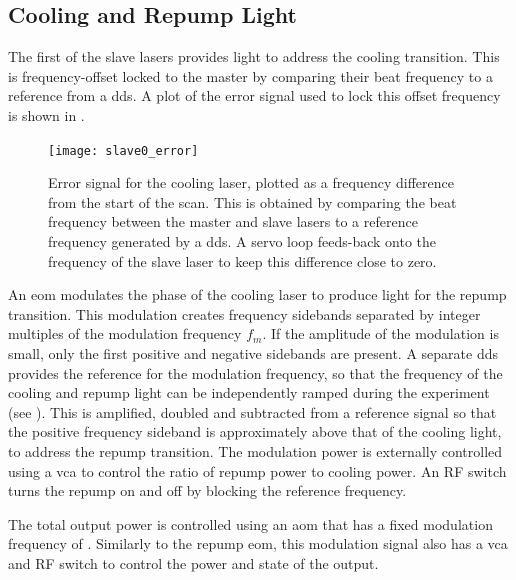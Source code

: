 \subsection{Cooling and Repump Light}
The first of the slave lasers provides light to address the cooling transition. This is
frequency-offset locked to the master by comparing their beat frequency to a
reference from a \ac{dds}. A plot of the error signal used to lock this offset
frequency is shown in .
\begin{figure}[!htbp]
	\centering
	\texttt{[image: slave0\_error]}
	\caption[Error Signal for the \Muquans\ Cooling laser.]{Error signal for the \Muquans cooling laser, plotted as a frequency difference from the start of the scan. This is obtained by comparing the beat frequency between the master and slave lasers to a reference frequency generated by a \ac{dds}. A servo loop feeds-back onto the frequency of the slave laser to keep this difference close to zero.}\label{fig:slave_offset}
\end{figure}
\par\noindent An \ac{eom} modulates the phase of the cooling laser to produce light for the  repump transition. This modulation creates frequency sidebands separated by integer multiples of the modulation frequency
\(f_m\). If the amplitude of the modulation is small, only the first
positive and negative sidebands are present. A separate \ac{dds} provides the reference for the modulation frequency, so that the frequency of the cooling and repump
light can be independently ramped during the experiment (see
). This is amplified, doubled and subtracted
from a  reference signal so that the positive
frequency sideband is approximately  above that of the
cooling light, to address the repump transition. The modulation power is externally controlled using a \ac{vca} to control the ratio of
repump power to cooling power. An RF switch turns the repump on and off by blocking the reference frequency. \par\noindent The total output power is controlled using an
\ac{aom} that has a fixed modulation frequency of .
Similarly to the repump \ac{eom}, this modulation signal also has a \ac{vca} and RF switch to control the power and state of the output.

